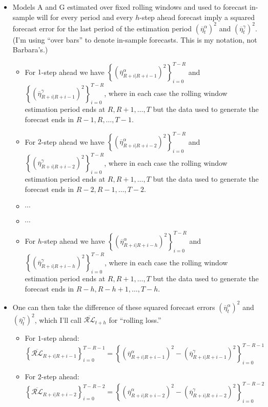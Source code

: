 \documentclass[11pt]{article}
\begin{document}
\begin{itemize}
\item Models A and G estimated over fixed rolling windows and used to forecast in-sample will for every period and every $h$-step ahead forecast imply a squared forecast error for the last period of the estimation period $\left(\overline{\eta}^{\alpha}_{t}\right)^{2}$ and
 $\left(\overline{\eta}^{\gamma}_{t}\right)^{2}$.  (I'm using ``over bars'' to denote in-sample forecasts.  This is my notation, not Barbara's.)
\begin{itemize}
\item For $1$-step ahead we have $\left\{\left(\overline{\eta}^{\alpha}_{R+i|R+i-1}\right)^{2}\right\}_{i=0}^{T-R}$ and $\left\{\left(\overline{\eta}^{\gamma}_{R+i|R+i-1}\right)^{2}\right\}_{i=0}^{T-R}$, where in each case the rolling window estimation period
ends at $R, R+1, \dots, T$ but the data used to generate the forecast ends in $R-1, R, \dots, T-1$.
\item For $2$-step ahead we have $\left\{\left(\overline{\eta}^{\alpha}_{R+i|R+i-2}\right)^{2}\right\}_{i=0}^{T-R}$ and $\left\{\left(\overline{\eta}^{\gamma}_{R+i|R+i-2}\right)^{2}\right\}_{i=0}^{T-R}$, where in each case the rolling window estimation period
ends at $R, R+1, \dots, T$ but the data used to generate the forecast ends in $R-2, R-1, \dots, T-2$.
\item $\cdots$
\item $\cdots$
\item For $h$-step ahead we have $\left\{\left(\overline{\eta}^{\alpha}_{R+i|R+i-h}\right)^{2}\right\}_{i=0}^{T-R}$ and $\left\{\left(\overline{\eta}^{\gamma}_{R+i|R+i-h}\right)^{2}\right\}_{i=0}^{T-R}$, where in each case the rolling window estimation period
ends at $R, R+1, \dots, T$ but the data used to generate the forecast ends in $R-h, R-h+1, \dots, T-h$.
\end{itemize}
\item One can then take the difference of these squared forecast errors $\left(\overline{\eta}^{\alpha}_{t}\right)^{2}$ and
 $\left(\overline{\eta}^{\gamma}_{t}\right)^{2}$, which I'll call $\overline{\mathcal{RL}}_{t+h}$ for ``rolling loss.''
\begin{itemize}
\item For $1$-step ahead: $\left\{\overline{\mathcal{RL}}_{R+i|R+i-1}\right\}_{i=0}^{T-R-1}\!\!\!\!=\left\{\left(\overline{\eta}^{\alpha}_{R+i|R+i-1}\right)^{2}\!\!-\left(\overline{\eta}^{\gamma}_{R+i|R+i-1}\right)^{2}\right\}_{i=0}^{T-R-1}$
\item For $2$-step ahead: $\left\{\overline{\mathcal{RL}}_{R+i|R+i-2}\right\}_{i=0}^{T-R-2}\!\!\!\!=\left\{\left(\overline{\eta}^{\alpha}_{R+i|R+i-2}\right)^{2}\!\!-\left(\overline{\eta}^{\gamma}_{R+i|R+i-2}\right)^{2}\right\}_{i=0}^{T-R-2}$

\end{itemize}
\end{itemize}
\end{document}

